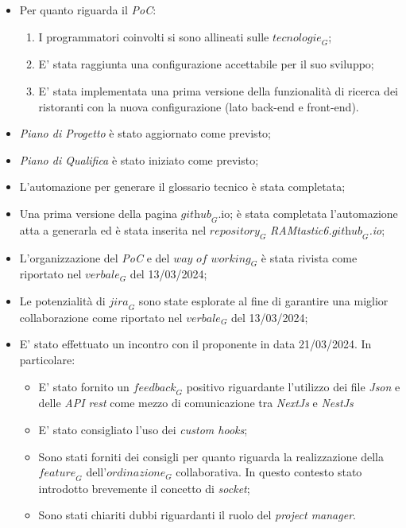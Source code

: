 \begin{itemize}
    \item Per quanto riguarda il \emph{PoC}:
    \begin{enumerate}
        \item I programmatori coinvolti si sono allineati sulle $\textit{tecnologie}_G$;
        \item E' stata raggiunta una configurazione accettabile per il suo sviluppo;
        \item E' stata implementata una prima versione della funzionalità di ricerca dei ristoranti con la nuova configurazione (lato back-end e front-end).
    \end{enumerate}
    \item \emph{Piano di Progetto} è stato aggiornato come previsto;
    \item \emph{Piano di Qualifica} è stato iniziato come previsto;
    \item L'automazione per generare il glossario tecnico è stata completata;
    \item Una prima versione della pagina $\textit{github}_G$.io; è stata completata l'automazione atta a generarla ed è stata inserita nel $\textit{repository}_G$ \emph{RAMtastic6.$\textit{github}_G$.io};
    \item L'organizzazione del \emph{PoC} e del $\textit{way of working}_G$ è stata rivista come riportato nel $\textit{verbale}_G$ del 13/03/2024;
    \item Le potenzialità di $\textit{jira}_G$ sono state esplorate al fine di garantire una miglior collaborazione come riportato nel $\textit{verbale}_G$ del 13/03/2024;
    \item E' stato effettuato un incontro con il proponente in data 21/03/2024. In particolare:
    \begin{itemize}
        \item E' stato fornito un $\textit{feedback}_G$ positivo riguardante l'utilizzo dei file \emph{Json} e delle \emph{API rest} come mezzo di comunicazione tra \emph{NextJs} e \emph{NestJs}
        \item E' stato consigliato l'uso dei \emph{custom hooks};
        \item Sono stati forniti dei consigli per quanto riguarda la realizzazione della $\textit{feature}_G$ dell'$\textit{ordinazione}_G$ collaborativa. In questo contesto stato introdotto brevemente il concetto di \emph{socket};
        \item Sono stati chiariti dubbi riguardanti il ruolo del \emph{project manager}.
    \end{itemize}
\end{itemize}
